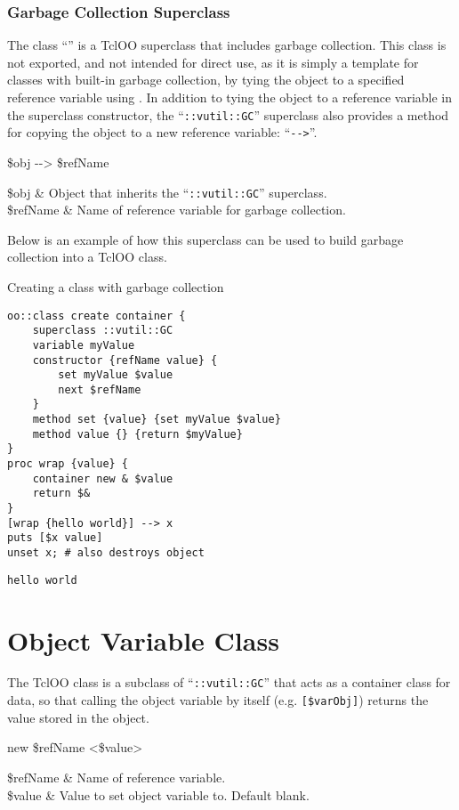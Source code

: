 \documentclass{article}
\begin{document}
\clearpage
\subsubsection{Garbage Collection Superclass}
The class ``\texttt{}'' is a TclOO superclass that includes garbage collection. 
This class is not exported, and not intended for direct use, as it is simply a template for classes with built-in garbage collection, by tying the object to a specified reference variable using .
In addition to tying the object to a reference variable in the superclass constructor, the ``\texttt{::vutil::GC}'' superclass also provides a method for copying the object to a new reference variable: ``\texttt{-{}->}''.
\begin{syntax}
\$obj -{}-> \$refName
\end{syntax}
\begin{args}
\$obj & Object that inherits the ``\texttt{::vutil::GC}'' superclass. \\
\$refName & Name of reference variable for garbage collection.
\end{args}

Below is an example of how this superclass can be used to build garbage collection into a TclOO class. 
\begin{example}{Creating a class with garbage collection}
\begin{lstlisting}
oo::class create container {
    superclass ::vutil::GC
    variable myValue
    constructor {refName value} {
        set myValue $value
        next $refName
    }
    method set {value} {set myValue $value}
    method value {} {return $myValue}
}
proc wrap {value} {
    container new & $value
    return $&
}
[wrap {hello world}] --> x
puts [$x value]
unset x; # also destroys object
\end{lstlisting}
\tcblower
\begin{lstlisting}
hello world
\end{lstlisting}
\end{example}
\clearpage
\section{Object Variable Class}
The TclOO class  is a subclass of ``\texttt{::vutil::GC}'' that acts as a container class for data, so that calling the object variable by itself (e.g. \texttt{[\$varObj]}) returns the value stored in the object.
\begin{syntax}
 new \$refName <\$value>
\end{syntax}
\begin{args}
\$refName & Name of reference variable. \\
\$value & Value to set object variable to. Default blank.
\end{args}
\end{document}
